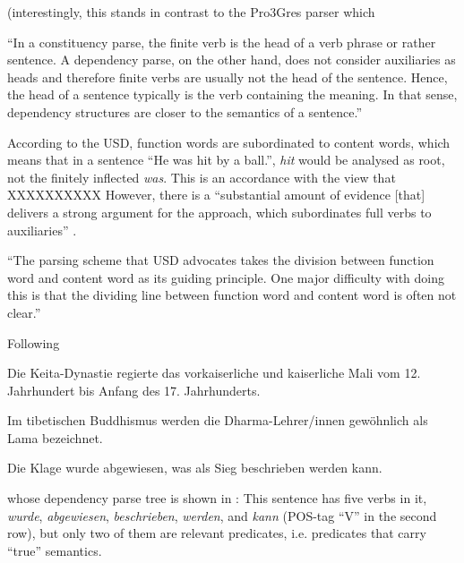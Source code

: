 (interestingly, this stands in contrast to the Pro3Gres parser \citep{schneider2008hybrid} which 

``In a constituency parse, the finite verb is the head of a verb phrase or rather sentence.
A dependency parse, on the other hand, does not consider auxiliaries as heads and therefore finite verbs are usually not the head of the sentence.
Hence, the head of a sentence typically is the verb containing the meaning.
In that sense, dependency structures are closer to the semantics of a sentence.'' \citep[p.~6f.]{aepli2018parsing}

According to the USD, function words are subordinated to content words, which means that in a sentence ``He was hit by a ball.'', \textit{hit} would be analysed as root, not the finitely inflected \textit{was}.
This is an accordance with the view that XXXXXXXXXX
However, there is a ``substantial amount of evidence [that] delivers a strong argument for the \textelp{} approach, which subordinates full verbs to auxiliaries'' \cite{gross2015dependency}.

``The parsing scheme that USD advocates takes the division between function word and content word as its guiding principle.
One major difficulty with doing this is that the dividing line between function word and content word is often not clear.'' \cite{gross2015dependency}


Following \cite{foth2006umfassende}

\begin{examples}
	\label{ex:one-predicate}
	\item Die Keita-Dynastie regierte das vorkaiserliche und kaiserliche Mali vom 12. Jahrhundert bis Anfang des 17. Jahrhunderts.
\end{examples}

\begin{examples}
	\label{ex:one-predicate-mod}
	\item Im tibetischen Buddhismus werden die Dharma-Lehrer/innen gewöhnlich als Lama bezeichnet.
\end{examples}

\begin{examples}
	\label{ex:multiple-predicates}
	\item Die Klage wurde abgewiesen, was als Sieg beschrieben werden kann.
\end{examples}

whose dependency parse tree is shown in :
This sentence has five verbs in it, \textit{wurde}, \textit{abgewiesen}, \textit{beschrieben}, \textit{werden}, and \textit{kann} (POS-tag ``V'' in the second row), but only two of them are relevant predicates, i.e. predicates that carry ``true'' semantics.

